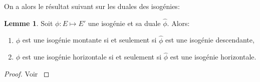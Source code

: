 \documentclass[10pt,a4paper]{book}
\theoremstyle{plain}
\theoremstyle{definition}
\newtheorem{lem}[thm]{Lemme}
\theoremstyle{definition}
\theoremstyle{definition}
\theoremstyle{definition}
\theoremstyle{remark}
\theoremstyle{remark}
\theoremstyle{definition}
\begin{document}
On a alors le résultat suivant sur les duales des isogénies:
\begin{lem}
\label{lem:dua:vol}
Soit $\phi : E \mapsto E'$ une isogénie et sa duale $\widehat{\phi}$. Alors:
\begin{enumerate}
\item $\phi$ est une isogénie montante si et seulement si $\widehat{\phi}$ est une isogénie descendante,
\item $\phi$ est une isogénie horizontale si et seulement si $\widehat{\phi}$ est une isogénie horizontale.
\end{enumerate}
\end{lem}

\begin{proof}
Voir \cite[Lemma 2.1]{FouquetMorain02}
\end{proof}
\end{document}
